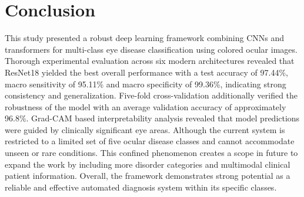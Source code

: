 \documentclass[conference,9pt]{IEEEtran}
\begin{document}
   
\section{\textbf{Conclusion }}
This study presented a robust deep learning framework combining CNNs and transformers for multi-class eye disease classification using colored ocular images. Thorough experimental evaluation across six modern architectures revealed that ResNet18 yielded the best overall performance with a test accuracy of 97.44\%, macro sensitivity of 95.11\% and macro specificity of 99.36\%, indicating strong consistency and generalization. Five-fold cross-validation additionally verified the robustness of the model with an average validation accuracy of approximately 96.8\%. Grad-CAM based interpretability analysis revealed that model predictions were guided by clinically significant eye areas. Although the current system is restricted to a limited set of five ocular disease classes and cannot accommodate unseen or rare conditions. This confined phenomenon creates a scope in future to expand the work by including more disorder categories and multimodal clinical patient information. Overall, the framework demonstrates strong potential as a reliable and effective automated diagnosis system within its specific classes.
\end{document}
